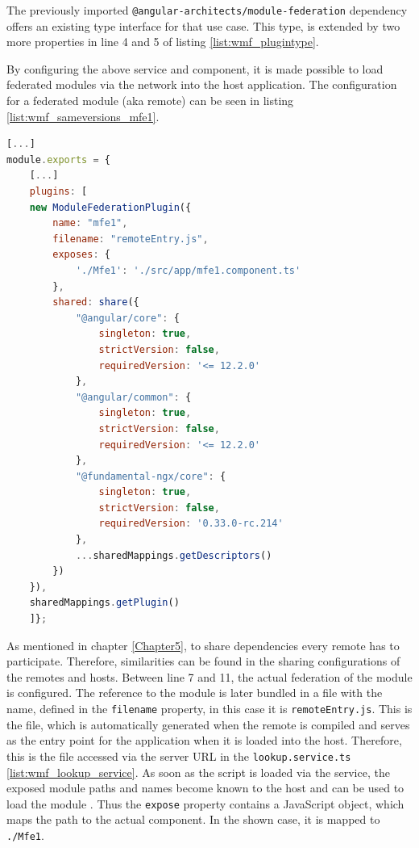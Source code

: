 The previously imported \texttt{@angular-architects/module-federation} dependency offers an existing type interface for that use case. This type, is extended by two more properties in line 4 and 5 of listing \ref{list:wmf_plugintype}.

By configuring the above service and component, it is made possible to load federated modules via the network into the host application.
The configuration for a federated module (aka remote) can be seen in listing \ref{list:wmf_sameversions_mfe1}.

\begin{lstlisting}[language=JavaScript, caption=Content of \texttt{webpack.config.js} of the mfe1 remote app of the same versions WMF project, label=list:wmf_sameversions_mfe1,  xleftmargin=.0\textwidth, xrightmargin=.0\textwidth]
[...]
module.exports = {
	[...]
	plugins: [
	new ModuleFederationPlugin({
		name: "mfe1",
		filename: "remoteEntry.js",
		exposes: {
			'./Mfe1': './src/app/mfe1.component.ts'
		},
		shared: share({
			"@angular/core": { 
				singleton: true, 
				strictVersion: false, 
				requiredVersion: '<= 12.2.0' 
			},
			"@angular/common": { 
				singleton: true, 
				strictVersion: false, 
				requiredVersion: '<= 12.2.0' 
			},
			"@fundamental-ngx/core": { 
				singleton: true, 
				strictVersion: false,
				requiredVersion: '0.33.0-rc.214' 
			},
			...sharedMappings.getDescriptors()
		})
	}),
	sharedMappings.getPlugin()
	]};
\end{lstlisting}

As mentioned in chapter \ref{Chapter5}, to share dependencies every remote has to participate. Therefore, similarities can be found in the sharing configurations of the remotes and hosts. 
Between line 7 and 11, the actual federation of the module is configured. The reference to the module is later bundled in a file with the name, defined in the \texttt{filename} property, in this case it is \texttt{remoteEntry.js}.
This is the file, which is automatically generated when the remote is compiled and serves as the entry point for the application when it is loaded into the host. Therefore, this is the file accessed via the server URL in the \texttt{lookup.service.ts} \ref{list:wmf_lookup_service}.
As soon as the script is loaded via the service, the exposed module paths and names become known to the host and can be used to load the module \cite{wmf_concepts}. Thus the \texttt{expose} property contains a JavaScript object, which maps the path to the actual component. In the shown case, it is mapped to \texttt{./Mfe1}.

